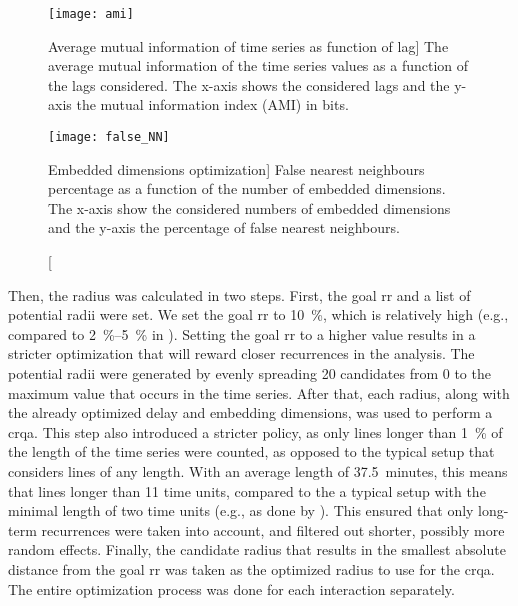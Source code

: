 \begin{figure}[H]
	\centering
	\begin{minipage}{.45\linewidth}
		\centering
		\texttt{[image: ami]}
		\caption
		[Average mutual information of time series as function of lag]
		{The average mutual information of the time series values as a function of the lags considered.
		The x-axis shows the considered lags and the y-axis the mutual information index (AMI) in bits.}
		\label{fig:ami}
	\end{minipage}%
	\hfill
	\begin{minipage}{.45\linewidth}
		\centering
		\texttt{[image: false\_NN]}
		\caption
		[Embedded dimensions optimization]
		{False nearest neighbours percentage as a function of the number of embedded dimensions.
		The x-axis show the considered numbers of embedded dimensions and the y-axis the percentage of false nearest neighbours.}
		\label{fig:false_nn}
	\end{minipage}	
\end{figure}

Then, the radius was calculated in two steps.
First, the goal \ac{rr} and a list of potential radii were set.
We set the goal \ac{rr} to \SI{10}{\percent}, which is relatively high (e.g., compared to \SIrange{2}{5}{\percent} in \citet{Coco2014crqa-r}).
Setting the goal \ac{rr} to a higher value results in a stricter optimization that will reward closer recurrences in the analysis.
The potential radii were generated by evenly spreading 20 candidates from 0 to the maximum value that occurs in the time series.
After that, each radius, along with the already optimized delay and embedding dimensions, was used to perform a \ac{crqa}.
This step also introduced a stricter policy, as only lines longer than \SI{1}{\percent} of the length of the time series were counted, as opposed to the typical setup that considers lines of any length.
With an average length of \SI{37.5}{minutes}, this means that lines longer than 11 time units, compared to the a typical setup with the minimal length of two time units (e.g., as done by \citet{Borrie2019syncing}).
This ensured that only long-term recurrences were taken into account, and filtered out shorter, possibly more random effects.
Finally, the candidate radius that results in the smallest absolute distance from the goal \ac{rr} was taken as the optimized radius to use for the \ac{crqa}.
The entire optimization process was done for each interaction separately.

